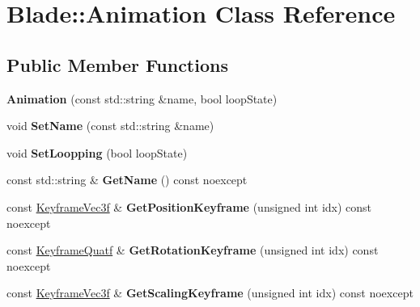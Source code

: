\hypertarget{class_blade_1_1_animation}{}\section{Blade\+:\+:Animation Class Reference}
\label{class_blade_1_1_animation}
\subsection*{Public Member Functions}
\begin{DoxyCompactItemize}
\item 
\mbox{\label{class_blade_1_1_animation_a10659aad5c72d1fd333b9b804939dfb7}} 
{\bfseries Animation} (const std\+::string \&name, bool loop\+State)
\item 
\mbox{\label{class_blade_1_1_animation_aa42b5ca8436e72de50933f8b36cbbe97}} 
void {\bfseries Set\+Name} (const std\+::string \&name)
\item 
\mbox{\label{class_blade_1_1_animation_ac7218b960ec725ac46707e030f640247}} 
void {\bfseries Set\+Loopping} (bool loop\+State)
\item 
\mbox{\label{class_blade_1_1_animation_a4e3f718b96a8d201b50a81c57e40cb02}} 
const std\+::string \& {\bfseries Get\+Name} () const noexcept
\item 
\mbox{\label{class_blade_1_1_animation_ab446adfe719290ffd9e09d641d147d6d}} 
const \hyperlink{struct_blade_1_1_keyframe}{Keyframe\+Vec3f} \& {\bfseries Get\+Position\+Keyframe} (unsigned int idx) const noexcept
\item 
\mbox{\label{class_blade_1_1_animation_a89860bfca9932bfb283a1c066e622b68}} 
const \hyperlink{struct_blade_1_1_keyframe}{Keyframe\+Quatf} \& {\bfseries Get\+Rotation\+Keyframe} (unsigned int idx) const noexcept
\item 
\mbox{\label{class_blade_1_1_animation_a4ebb4b87cc087fb0b9c91c75d8ab5f04}} 
const \hyperlink{struct_blade_1_1_keyframe}{Keyframe\+Vec3f} \& {\bfseries Get\+Scaling\+Keyframe} (unsigned int idx) const noexcept

\end{DoxyCompactItemize}
